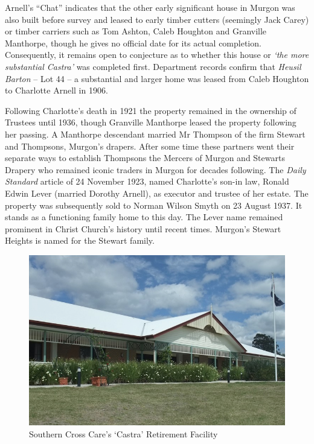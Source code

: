 Arnell's ``Chat'' indicates that the other early significant house in Murgon was also built before survey and leased to early timber cutters (seemingly Jack Carey) or timber carriers such as Tom Ashton, Caleb Houghton and Granville Manthorpe, though he gives no official date for its actual completion. Consequently, it remains open to conjecture as to whether this house or \emph{`the more substantial Castra'} was completed first. Department records confirm that \emph{Heusil Barton} -- Lot 44 -- a substantial and larger home was leased from Caleb Houghton to Charlotte Arnell in 1906.



Following Charlotte's death in 1921 the property remained in the ownership of Trustees until 1936, though Granville Manthorpe leased the property following her passing. A Manthorpe descendant married Mr Thompson of the firm Stewart and Thompsons, Murgon's drapers. After some time these partners went their separate ways to establish Thompsons the Mercers of Murgon and Stewarts Drapery who remained iconic traders in Murgon for decades following. The \emph{Daily Standard} article of 24 November 1923, named Charlotte's son-in law, Ronald Edwin Lever (married Dorothy Arnell), as executor and trustee of her estate. The property was subsequently sold to Norman Wilson Smyth on 23 August 1937. It stands as a functioning family home to this day. The Lever name remained prominent in Christ Church's history until recent times. Murgon's Stewart Heights is named for the Stewart family.









\begin{figure}
\begin{center}
\includegraphics[width=1.\linewidth,center]{../images/castraToday.png}
\caption{ Southern Cross Care's `Castra' Retirement Facility}
\end{center}
\end{figure}




